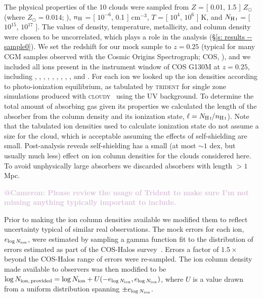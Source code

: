 \documentclass[fleqn,usenatbib]{mnras}
\makeatletter
\newcommand{\atcameron}[1]{\textcolor{Thistle}{\textbf{@Cameron: #1}}}
\makeatother
\begin{document}
The physical properties of the 10 clouds were sampled from $Z$ = [ 0.01, 1.5 ] $Z_\odot$ (where $Z_\odot = 0.014$; \citealt{Asplund2009}), $n_{\rm H}$ = [ $10^{-6}$, 0.1 ] cm$^{-3}$, $T$ = [ $10^4$, $10^6$ ] K, and $N_{\ion{H}{I}}$ = [ $10^{15}$, $10^{17}$ ].
The values of density, temperature, metallicity, and  column density were chosen to be uncorrelated, which plays a role in the analysis (\S\ref{s: results -- sample0}).
We set the redshift for our mock sample to $z=0.25$ (typical for many CGM samples observed with the Cosmic Origins Spectrograph; COS, \citealt{Green2012}), and we included all ions present in the instrument window of COS G130M at $z=0.25$, including , , , , , , ,  , , and .
For each ion we looked up the ion densities according to photo-ionization equilibrium, as tabulated by \textsc{trident} for single zone simulations produced with \textsc{cloudy}~\citep{Ferland2013} using the \cite{Haardt2012} UV background.
To determine the total amount of absorbing gas given its properties we calculated the length of the absorber from the  column density and its ionization state, $\ell = N_{\ion{H}{I}} / n_{\ion{H}{I}}$).
Note that the tabulated ion densities used to calculate ionization state do not assume a size for the cloud, which is acceptable assuming the effects of self-shielding are small.
Post-analysis reveals self-shielding has a small (at most $\sim 1$ dex, but usually much less) effect on ion column densities for the clouds considered here.
To avoid unphysically large absorbers we discarded absorbers with length $> 1$ Mpc.

\atcameron{Please review the usage of Trident to make sure I'm not missing anything typically important to include.}

Prior to making the ion column densities available we modified them to reflect uncertainty typical of similar real observations.
The mock errors for each ion, $e_{\log N_{\rm ion}}$, were estimated by sampling a gamma function fit to the distribution of errors estimated as part of the COS-Halos survey~\citep{Werk2013}.
Errors a factor of $1.5\times$ beyond the COS-Halos range of errors were re-sampled.
The ion column density made available to observers was then modified to be $\log N_{\rm ion,\,provided} = \log N_{\rm ion} + U(-e_{\log N_{\rm ion}}, e_{\log N_{\rm ion}} )$, where $U$ is a value drawn from a uniform distribution spanning $\pm e_{\log N_{\rm ion}}$.
\end{document}
